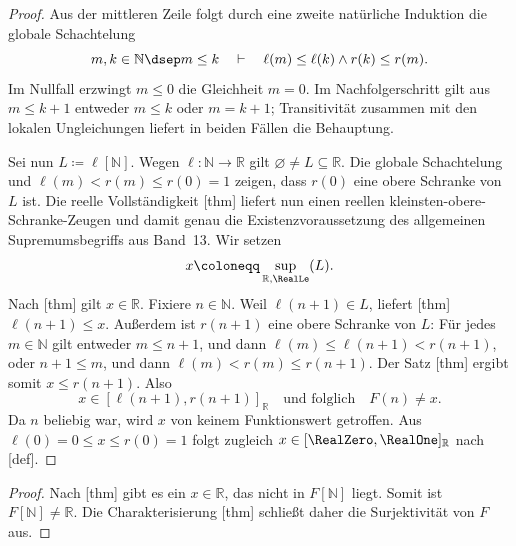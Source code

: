 \documentclass[main.tex]{subfiles}
\begin{document}
\begin{proof}
Aus der mittleren Zeile folgt durch eine zweite natürliche Induktion die
globale Schachtelung
\[
  m,k\in\mathbb N\dsep m\leq k
  \quad\vdash\quad
  \ell(m)\leq\ell(k)\land r(k)\leq r(m).
\]
Im Nullfall erzwingt \(m\leq0\) die Gleichheit \(m=0\). Im
Nachfolgerschritt gilt aus \(m\leq k+1\) entweder \(m\leq k\) oder
\(m=k+1\); Transitivität zusammen mit den lokalen Ungleichungen liefert
in beiden Fällen die Behauptung.

Sei nun \(L\coloneqq\ell[\mathbb N]\). Wegen
\(\ell\colon\mathbb N\to\mathbb R\) gilt
\(\varnothing\neq L\subseteq\mathbb R\). Die globale Schachtelung und
\(\ell(m)<r(m)\leq r(0)=1\) zeigen, dass \(r(0)\) eine obere Schranke von
\(L\) ist. Die reelle Vollständigkeit
[thm] liefert nun einen reellen
kleinsten-obere-Schranke-Zeugen und damit genau die Existenzvoraussetzung des
allgemeinen Supremumsbegriffs aus Band~13. Wir setzen
\[
  x\coloneqq\sup_{\mathbb R,\RealLe}(L).
\]
Nach [thm] gilt \(x\in\mathbb R\).
Fixiere \(n\in\mathbb N\). Weil \(\ell(n+1)\in L\), liefert
[thm]
\(\ell(n+1)\leq x\). Außerdem ist \(r(n+1)\) eine obere Schranke
von \(L\): Für jedes
\(m\in\mathbb N\) gilt entweder \(m\leq n+1\), und dann
\(\ell(m)\leq\ell(n+1)<r(n+1)\), oder
\(n+1\leq m\), und dann
\(\ell(m)<r(m)\leq r(n+1)\). Der Satz
[thm] ergibt somit
\(x\leq r(n+1)\). Also
\[
  x\in[\ell(n+1),r(n+1)]_{\mathbb R}
  \quad\text{und folglich}\quad F(n)\neq x.
\]
Da \(n\) beliebig war, wird \(x\) von keinem Funktionswert getroffen. Aus
\(\ell(0)=0\leq x\leq r(0)=1\) folgt zugleich
\(x\in[\RealZero,\RealOne]_{\mathbb R}\) nach
[def].
\end{proof}

\begin{proof}
Nach [thm] gibt es ein
\(x\in\mathbb R\), das nicht in \(F[\mathbb N]\) liegt. Somit ist
\(F[\mathbb N]\neq\mathbb R\). Die Charakterisierung
[thm] schließt daher die
Surjektivität von \(F\) aus.
\end{proof}
\end{document}
